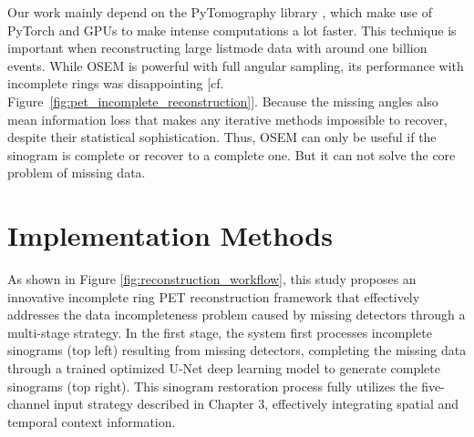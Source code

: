 \documentclass[
reprint,
superscriptaddress,
nofootinbib,
amsmath,amssymb,
aps,
prd,
]{revtex4-2}
\begin{document}
Our work mainly depend on the PyTomography library \cite{POLSON2025102020}, which make use of PyTorch and GPUs to make intense computations a lot faster. This technique is important when reconstructing large listmode data with around one billion events.
While OSEM is powerful with full angular sampling, its performance with incomplete rings was disappointing [cf. Figure~\ref{fig:pet_incomplete_reconstruction}]. Because the missing angles also mean information loss that makes any iterative methods impossible to recover, despite their statistical sophistication. 
Thus, OSEM can only be useful if the sinogram is complete or recover to a complete one. But it can not solve the core problem of missing data.




\section{Implementation Methods}
\label{chap:methods}


As shown in Figure \ref{fig:reconstruction_workflow}, this study proposes an innovative incomplete ring PET reconstruction framework that effectively addresses the data incompleteness problem caused by missing detectors through a multi-stage strategy. In the first stage, the system first processes incomplete sinograms (top left) resulting from missing detectors, completing the missing data through a trained optimized U-Net deep learning model to generate complete sinograms (top right). This sinogram restoration process fully utilizes the five-channel input strategy described in Chapter 3, effectively integrating spatial and temporal context information.
\end{document}
